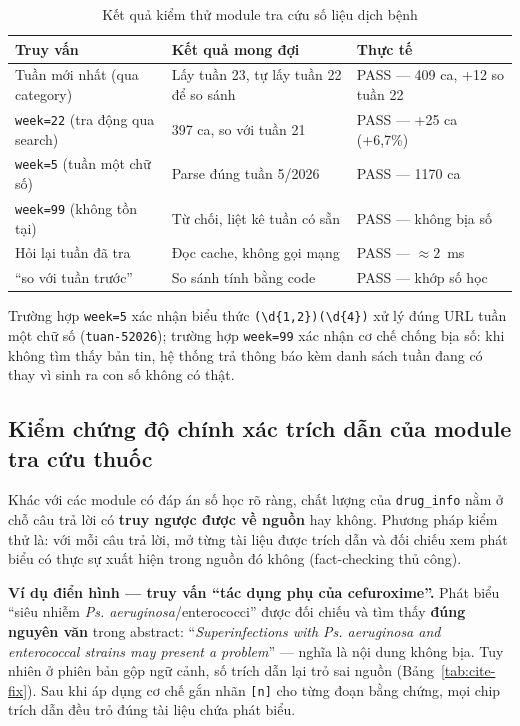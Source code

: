 \documentclass[a4paper,13pt,3p,oneside]{report}
\theoremstyle{definition}
\theoremstyle{remark}
\theoremstyle{definition}
\begin{document}
\begin{table}[H]
\centering
\begin{tabular}{|p{4.2cm}|p{4.3cm}|p{4.3cm}|}
\hline
\textbf{Truy vấn} & \textbf{Kết quả mong đợi} & \textbf{Thực tế} \\
\hline
Tuần mới nhất (qua category) & Lấy tuần 23, tự lấy tuần 22 để so sánh & PASS --- 409 ca, +12 so tuần 22 \\
\hline
\texttt{week=22} (tra động qua search) & 397 ca, so với tuần 21 & PASS --- +25 ca (+6,7\%) \\
\hline
\texttt{week=5} (tuần một chữ số) & Parse đúng tuần 5/2026 & PASS --- 1170 ca \\
\hline
\texttt{week=99} (không tồn tại) & Từ chối, liệt kê tuần có sẵn & PASS --- không bịa số \\
\hline
Hỏi lại tuần đã tra & Đọc cache, không gọi mạng & PASS --- $\approx 2$~ms \\
\hline
``so với tuần trước'' & So sánh tính bằng code & PASS --- khớp số học \\
\hline
\end{tabular}
\caption{Kết quả kiểm thử module tra cứu số liệu dịch bệnh}
\label{tab:outbreak-test}
\end{table}

Trường hợp \texttt{week=5} xác nhận biểu thức \texttt{(\textbackslash d\{1,2\})(\textbackslash d\{4\})} xử lý đúng URL tuần một chữ số (\texttt{tuan-52026}); trường hợp \texttt{week=99} xác nhận cơ chế chống bịa số: khi không tìm thấy bản tin, hệ thống trả thông báo kèm danh sách tuần đang có thay vì sinh ra con số không có thật.

\subsection{Kiểm chứng độ chính xác trích dẫn của module tra cứu thuốc}

Khác với các module có đáp án số học rõ ràng, chất lượng của \texttt{drug\_info} nằm ở chỗ câu trả lời có \textbf{truy ngược được về nguồn} hay không. Phương pháp kiểm thử là: với mỗi câu trả lời, mở từng tài liệu được trích dẫn và đối chiếu xem phát biểu có thực sự xuất hiện trong nguồn đó không (fact-checking thủ công).

\textbf{Ví dụ điển hình --- truy vấn ``tác dụng phụ của cefuroxime''.} Phát biểu ``siêu nhiễm \textit{Ps. aeruginosa}/enterococci'' được đối chiếu và tìm thấy \textbf{đúng nguyên văn} trong abstract: ``\textit{Superinfections with Ps. aeruginosa and enterococcal strains may present a problem}'' --- nghĩa là nội dung không bịa. Tuy nhiên ở phiên bản gộp ngữ cảnh, số trích dẫn lại trỏ sai nguồn (Bảng~\ref{tab:cite-fix}). Sau khi áp dụng cơ chế gắn nhãn \texttt{[n]} cho từng đoạn bằng chứng, mọi chip trích dẫn đều trỏ đúng tài liệu chứa phát biểu.
\end{document}
